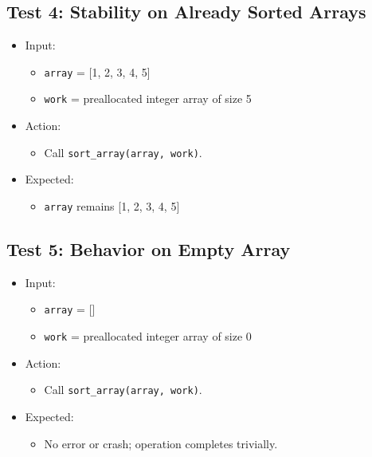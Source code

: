 \documentclass{article}
\begin{document}
\subsection{Test 4: Stability on Already Sorted Arrays}

\begin{itemize}
    \item Input:
    \begin{itemize}
        \item \texttt{array} = [1, 2, 3, 4, 5]
        \item \texttt{work} = preallocated integer array of size 5
    \end{itemize}
    \item Action:
    \begin{itemize}
        \item Call \texttt{sort\_array(array, work)}.
    \end{itemize}
    \item Expected:
    \begin{itemize}
        \item \texttt{array} remains [1, 2, 3, 4, 5]
    \end{itemize}
\end{itemize}

\subsection{Test 5: Behavior on Empty Array}

\begin{itemize}
    \item Input:
    \begin{itemize}
        \item \texttt{array} = []
        \item \texttt{work} = preallocated integer array of size 0
    \end{itemize}
    \item Action:
    \begin{itemize}
        \item Call \texttt{sort\_array(array, work)}.
    \end{itemize}
    \item Expected:
    \begin{itemize}
        \item No error or crash; operation completes trivially.
    \end{itemize}
\end{itemize}
\end{document}
